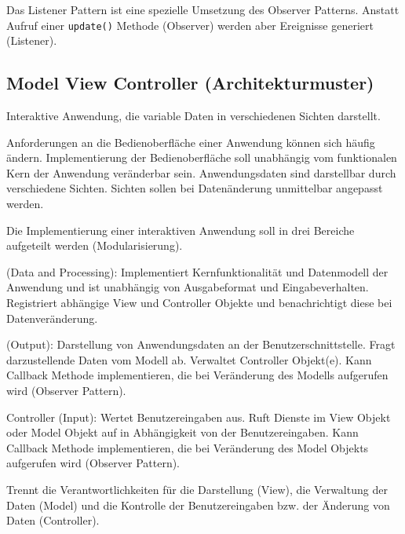 \documentclass[a4paper,fontsize=9pt, DIV=calc]{scrartcl}
\begin{document}
\begin{multicols}{2}
\begin{multicols}{2}
		
\end{multicols}

Das Listener Pattern ist eine spezielle Umsetzung des Observer Patterns. Anstatt Aufruf einer \texttt{update()} Methode (Observer) werden aber Ereignisse generiert (Listener).

\subsection{Model View Controller (Architekturmuster)}

\begin{description}[leftmargin=*]\itemsep-2mm
\item[Kontext] Interaktive Anwendung, die variable Daten in verschiedenen Sichten darstellt.
\item[Problem] Anforderungen an die Bedienoberfläche einer Anwendung können sich häufig ändern. Implementierung der Bedienoberfläche soll unabhängig vom funktionalen Kern der Anwendung veränderbar sein. Anwendungsdaten sind darstellbar durch verschiedene Sichten. Sichten sollen bei Datenänderung unmittelbar angepasst werden.
\item[Lösung] Die Implementierung einer interaktiven Anwendung soll in drei Bereiche aufgeteilt werden (Modularisierung).
\item[Model] (Data and Processing): Implementiert Kernfunktionalität und Datenmodell der Anwendung und ist unabhängig von Ausgabeformat und Eingabeverhalten. Registriert abhängige View und Controller Objekte und benachrichtigt diese bei Datenveränderung.
\item[View] (Output): Darstellung von Anwendungsdaten an der Benutzerschnittstelle. Fragt darzustellende Daten vom Modell ab. Verwaltet Controller Objekt(e). Kann Callback Methode implementieren, die bei Veränderung des Modells aufgerufen wird (Observer Pattern).
\item[Controller] Controller (Input): Wertet Benutzereingaben aus. Ruft Dienste im View Objekt oder Model Objekt auf in Abhängigkeit von der Benutzereingaben. Kann Callback Methode implementieren, die bei Veränderung des Model Objekts aufgerufen wird (Observer Pattern).
\item[Seperation of Concerns] Trennt die Verantwortlichkeiten für die Darstellung (View), die Verwaltung der Daten (Model) und die Kontrolle der Benutzereingaben bzw. der Änderung von Daten (Controller).

\end{description}
\end{multicols}
\end{document}
